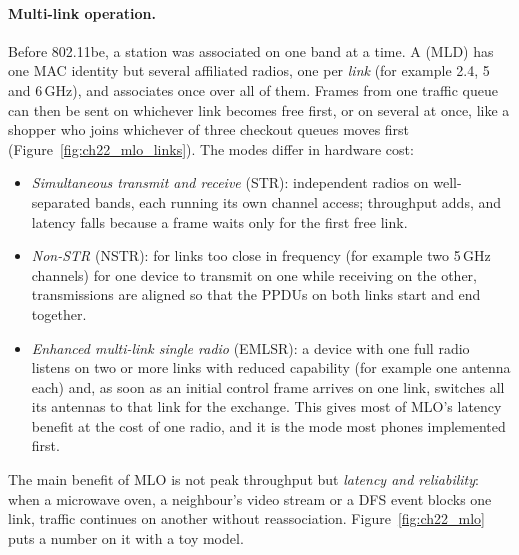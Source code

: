 \paragraph{Multi-link operation.} Before 802.11be, a station was associated on one band at a time.
A  (MLD) has one MAC identity but several affiliated radios, one per
\emph{link} (for example 2.4, 5 and 6\,GHz), and associates once over all of them. Frames from one
traffic queue can then be sent on whichever link becomes free first, or on several at once, like a
shopper who joins whichever of three checkout queues moves first (Figure~\ref{fig:ch22_mlo_links}).
The modes differ in hardware cost:
\begin{itemize}
\item \emph{Simultaneous transmit and receive} (STR): independent radios on well-separated bands,
each running its own channel access; throughput adds, and latency falls because a frame waits only
for the first free link.
\item \emph{Non-STR} (NSTR): for links too close in frequency (for example two 5\,GHz channels) for
one device to transmit on one while receiving on the other, transmissions are aligned so that the
PPDUs on both links start and end together.
\item \emph{Enhanced multi-link single radio} (EMLSR): a device with one full radio listens on two or
more links with reduced capability (for example one antenna each) and, as soon as an initial control
frame arrives on one link, switches all its antennas to that link for the exchange. This gives most
of MLO's latency benefit at the cost of one radio, and it is the mode most phones implemented first.
\end{itemize}
The main benefit of MLO is not peak throughput but \emph{latency and reliability}: when a microwave
oven, a neighbour's video stream or a DFS event blocks one link, traffic continues on another
without reassociation. Figure~\ref{fig:ch22_mlo} puts a number on it with a toy model.


